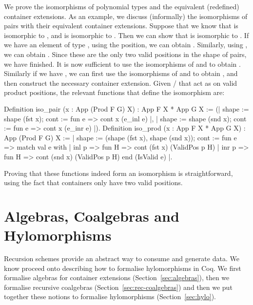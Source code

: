\documentclass[anonymous, a4paper, UKenglish, cleveref, autoref, thm-restate]{lipics-v2021}
\begin{document}
We prove the isomorphisms of polynomial types and the equivalent (redefined)
container extensions. As an example, we discuss (informally) the isomorphisms
of pairs with their equivalent container extensions. Suppose that we
know that  is isomorphic to , and
 is isomorphic to . Then we can
show that  is isomorphic to
.  If we have an element of type 
,
using the  position, we can obtain
.  Similarly, using , we can
obtain . Since these are the only two valid positions
in the shape of pairs, we have finished. It is now sufficient to use the
isomorphisms of  and  to
obtain . Similarly if we have ,
we can first use the isomorphisms of 
 and
 to obtain
, and then construct the necessary container
extension. Given / that act as
 on valid product positions, the relevant
functions that define the isomorphism are:
\begin{coqcode}
Definition iso_pair (x : App (Prod F G) X) : App F X * App G X :=
  ({| shape := shape (fst x); cont := fun e => cont x (e_inl e) |}, 
   {| shape := shape (snd x); cont := fun e => cont x (e_inr e) |}).
Definition iso_prod (x : App F X * App G X) : App (Prod F G) X :=
{| shape := (shape (fst x), shape (snd x));
   cont := fun e => match val e with 
                    | inl p => fun H => cont (fst x) (ValidPos p H)
                    | inr p => fun H => cont (snd x) (ValidPos p H)
                    end (IsValid e)
|}.
\end{coqcode}
Proving that these functions indeed form an isomorphism is straightforward,
using the fact that  containers only have two valid positions.

\section{Algebras, Coalgebras and Hylomorphisms}
Recursion schemes provide an abstract way to consume and generate data. We know
proceed onto describing how to formalise hylomorphisms in Coq. We first
formalise algebras for container extensions (Section~\ref{sec:algebras}), then
we formalise recursive coalgebras (Section~\ref{sec:rec-coalgebras}) and then we
put together these notions to formalise hylomorphisms (Section~\ref{sec:hylo}).
\end{document}
